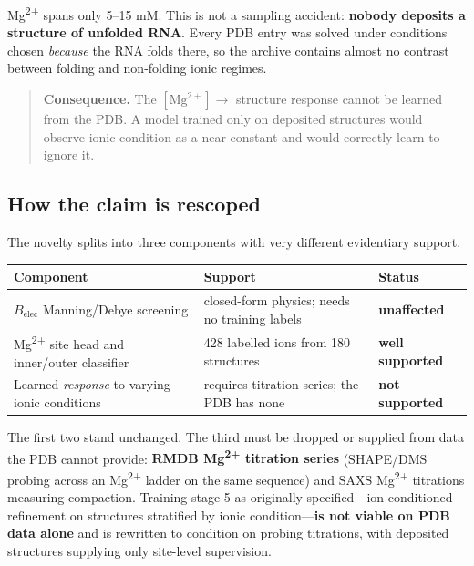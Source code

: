 \documentclass[11pt,a4paper]{article}
\begin{document}
Mg\textsuperscript{2+} spans only 5--15 mM. This is not a sampling accident:
\textbf{nobody deposits a structure of unfolded RNA}. Every PDB entry was solved
under conditions chosen \emph{because} the RNA folds there, so the archive
contains almost no contrast between folding and non-folding ionic regimes.

\begin{quote}
\textcolor{risk}{\textbf{Consequence.}} The $[\mathrm{Mg}^{2+}] \rightarrow$
structure response cannot be learned from the PDB. A model trained only on
deposited structures would observe ionic condition as a near-constant and would
correctly learn to ignore it.
\end{quote}

\subsection{How the claim is rescoped}

The novelty splits into three components with very different evidentiary support.

\begin{table}[h]
\centering
\begin{tabular}{>{\raggedright\arraybackslash}p{5.2cm}>{\raggedright\arraybackslash}p{5.6cm}>{\raggedright\arraybackslash}p{3.4cm}}
\toprule
\textbf{Component} & \textbf{Support} & \textbf{Status} \\
\midrule
$B_{\mathrm{elec}}$ Manning/Debye screening & closed-form physics; needs no training labels & \textbf{unaffected} \\
Mg\textsuperscript{2+} site head and inner/outer classifier & 17{,}428 labelled ions from 180 structures & \textbf{well supported} \\
Learned \emph{response} to varying ionic conditions & requires titration series; the PDB has none & \textcolor{risk}{\textbf{not supported}} \\
\bottomrule
\end{tabular}
\end{table}

The first two stand unchanged. The third must be dropped or supplied from data
the PDB cannot provide: \textbf{RMDB Mg\textsuperscript{2+} titration series}
(SHAPE/DMS probing across an Mg\textsuperscript{2+} ladder on the same sequence)
and SAXS Mg\textsuperscript{2+} titrations measuring compaction. Training stage 5
as originally specified---ion-conditioned refinement on structures stratified by
ionic condition---\textbf{is not viable on PDB data alone} and is rewritten to
condition on probing titrations, with deposited structures supplying only
site-level supervision.
\end{document}
